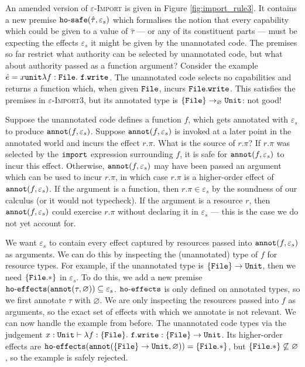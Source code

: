 An amended version of \textsc{$\varepsilon$-Import} is given in Figure
\ref{fig:import_rule3}. It contains a new premise
$\mathtt{ho \hbox{-} safe}(\hat \tau, \varepsilon_s)$ which formalises the notion that
every capability which could be given to a value of $\hat \tau$ --- or
any of its constituent parts --- must be expecting the effects
$\varepsilon_s$ it might be given by the unannotated code.
The premises so far restrict what authority can be selected by
unannotated code, but what about authority passed as a function
argument? Consider the example
$\hat e = {x}{\mathtt{unit}}{\lambda f: { \mathtt{File}
  }.~\mathtt{f.write}}$. The unannotated code selects no capabilities and
returns a function which, when given $\mathtt{File}$, incurs
$\mathtt{File.write}$. This satisfies the premises in
\textsc{$\varepsilon$-Import3}, but its annotated type is
$\{ \mathtt{File} \} \rightarrow_{\varnothing} \mathtt{Unit}$: not good!

Suppose the unannotated code defines a function $f$, which gets
annotated with $\varepsilon_s$ to produce
$\mathtt{annot}(f, \varepsilon_s)$. Suppose $\mathtt{annot}(f, \varepsilon_s)$ is
invoked at a later point in the annotated world and incurs the effect
$r.\pi$. What is the source of $r.\pi$? If $r.\pi$ was selected by the
$\mathtt{import}$ expression surrounding $f$, it is safe for
$\mathtt{annot}(f, \varepsilon_s)$ to incur this effect. Otherwise,
$\mathtt{annot}(f, \varepsilon_s)$ may have been passed an argument which can
be used to incur $r.\pi$, in which case $r.\pi$ is a higher-order
effect of $\mathtt{annot}(f, \varepsilon_s)$. If the argument is a function,
then $r.\pi \in \varepsilon_s$ by the soundness of our calculus (or it
would not typecheck). If the argument is a resource $r$, then
$\mathtt{annot}(f, \varepsilon_s)$ could exercise $r.\pi$ without declaring it
in $\varepsilon_s$ --- this is the case we do not yet account for.

We want $\varepsilon_s$ to contain every effect captured by resources
passed into $\mathtt{annot}(f, \varepsilon_s)$ as arguments. We can do this by
inspecting the (unannotated) type of $f$ for resource types. For
example, if the unannotated type is
$\mathtt{ \{ File \} \rightarrow \mathtt{Unit}}$, then we need
$\mathtt{ \{ File.* \} }$ in $\varepsilon_s$. To do this, we add a new
premise $\mathtt{ho \hbox{-} effects}(\mathtt{annot}(\tau, \varnothing)) \subseteq
\varepsilon_s$. $\mathtt{ho \hbox{-} effects}$ is only defined on
annotated types, so we first annotate $\tau$ with $\varnothing$. We
are only inspecting the resources passed into $f$ as arguments, so the
exact set of effects with which we annotate is not relevant.
We can now handle the example from before. The unannotated code
types via the judgement
$x: \mathtt{Unit} \vdash \lambda f: \{ \mathtt{File} \}.~\mathtt{f.write}: \{ \mathtt{File} \}
\rightarrow \mathtt{Unit}$. Its higher-order effects are
$\mathtt{ho \hbox{-} effects}(\mathtt{annot}( \{ \mathtt{File} \} \rightarrow \mathtt{Unit}, \varnothing)) = \{
\mathtt{File.*} \}$, but $\{ \mathtt{File.*} \} \not\subseteq \varnothing$,
so the example is safely rejected.

